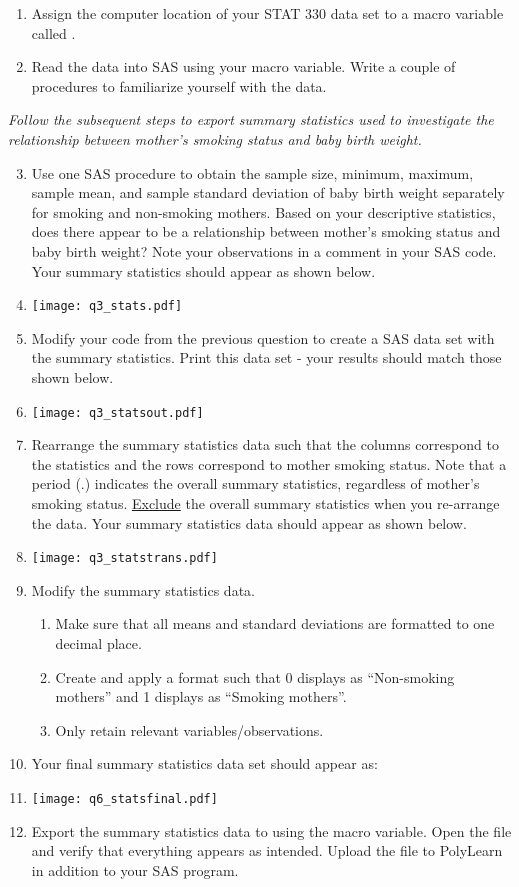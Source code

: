 \begin{enumerate}
\item Assign the computer location of your STAT 330 data set to a macro variable called .
\item Read the  data into SAS using your  macro variable.  Write a couple of procedures to familiarize yourself with the data.
\end{enumerate}
\emph{Follow the subsequent steps to export summary statistics used to investigate the relationship between mother's smoking status and baby birth weight.}
\begin{enumerate}
\setcounter{enumi}{2}
\item Use one SAS procedure to obtain the sample size, minimum, maximum, sample mean, and sample standard deviation of baby birth weight separately for smoking and non-smoking mothers.  Based on your descriptive statistics, does there appear to be a relationship between mother's smoking status and baby birth weight? Note your observations in a comment in your SAS code.  Your summary statistics should appear as shown below.
\item[] \texttt{[image: q3\_stats.pdf]}
\item Modify your code from the previous question to create a SAS data set with the summary statistics.  Print this data set - your results should match those shown below.
\item[] \texttt{[image: q3\_statsout.pdf]}
\item Rearrange the summary statistics data such that the columns correspond to the statistics and the rows correspond to mother smoking status.  Note that a period (.) indicates the overall summary statistics, regardless of mother's smoking status.  \underline{Exclude} the overall summary statistics when you re-arrange the data.  Your summary statistics data should appear as shown below.
\item[] \texttt{[image: q3\_statstrans.pdf]}
\item Modify the summary statistics data.
\begin{enumerate}
\item Make sure that all means and standard deviations are formatted to one decimal place.
\item Create and apply a format such that 0 displays as ``Non-smoking mothers'' and 1 displays as ``Smoking mothers''.
\item Only retain relevant variables/observations.
\end{enumerate}
\item[] Your final summary statistics data set should appear as:
\item[] \texttt{[image: q6\_statsfinal.pdf]}
\item Export the summary statistics data to  using the  macro variable.  Open the  file and verify that everything appears as intended.  Upload the  file to PolyLearn in addition to your SAS program.
\end{enumerate}
